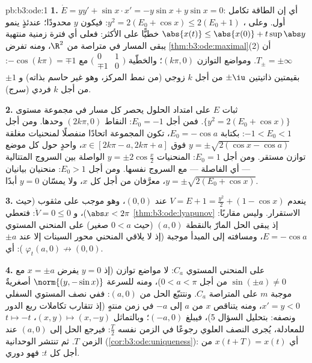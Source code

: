 \begin{solution}{pb:b3:ode:1}
\textbf{1.} $\dot E = yy' + \sin x\cdot x' = -y\sin x +
y\sin x = 0$: أي إن الطاقة تكامل أول. وعلى ،
$y^2 = 2(E_0 + \cos x) \leq 2(E_0 + 1)$: فيكون $y$ محدودًا؛ عندئذٍ ينمو $\abs{x(t)} \leq \abs{x(0)} +
t\sup\abs y$ خطيًّا على
الأكثر: فعلى أي فترة زمنية منتهية يبقى المسار في متراصة من
$\R^2$، ومنه تفرض \cref{thm:b3:ode:maximal}(2) أن $T_\pm = \pm\infty$. ومواضع التوازن
$(k\pi, 0)$؛ والخطّية $\bigl(\begin{smallmatrix}0&1\\
\mp1&0\end{smallmatrix}\bigr)$ مع $-\cos(k\pi) = \mp1$: بقيمتين ذاتيتين
$\pm\iu$ من أجل $k$ زوجي (من نمط المركز، وهو غير حاسم بذاته)
و $\pm1$ من أجل $k$ فردي (سرج).

\textbf{2.} ثبات $E$ على امتداد الحلول يحصر كل مسار في مجموعة
مستوى $\{y^2 = 2(E_0 + \cos x)\}$. فمن أجل $E_0 = -1$: النقاط $(2k\pi, 0)$ وحدها.
ومن أجل $-1 < E_0 <
1$: بكتابة $E_0 = -\cos a$، تكون المجموعة اتحادًا
منفصلًا لمنحنيات مغلقة $y = \pm\sqrt{2(\cos x - \cos a)}$ فوق $x \in
[2k\pi - a, 2k\pi + a]$، واحدٍ حول كل موضع
توازن مستقر. ومن أجل $E_0 = 1$: المنحنيات $y = \pm2\cos\frac x2$ الواصلة بين
السروج المتتالية --- أي الفاصلة --- مع السروج نفسها. ومن أجل
$E_0 > 1$: منحنيان بيانيان $y =
\pm\sqrt{2(E_0 + \cos x)}$، معرَّفان من أجل كل $x$،
ولا يمسّان $y = 0$ أبدًا.

\textbf{3.} ينعدم $V = E + 1 = \frac{y^2}2 + (1 - \cos x)$ عند $(0,0)$، وهو موجب على  مثقوب
(حيث $\abs x < 2\pi$)، و $\dot V = 0 \leq 0$: فتعطي \cref{thm:b3:ode:lyapunov} الاستقرار.
وليس مقاربًا: إذ يبقى الحل المارّ بالنقطة $(a, 0)$ (حيث
$0 < a$ صغير) على المنحني المستوي $E = -\cos a$، ومسافته إلى
المبدأ موجبة (إذ لا يلاقي المنحني محور السينات إلا عند
$\pm a$): أي $\varphi_t(a, 0) \not\to (0,0)$.

\textbf{4.} على المنحني المستوي $C_a$: لا مواضع توازن (إذ
$y = 0$ يفرض $x = \pm a$ مع $\sin(\pm a) \neq 0$ من أجل $0 < a <
\pi$)، ومنه
للسرعة $\norm{(y, -\sin x)}$ أصغريةٌ موجبة $m$ على المتراصة $C_a$. ونتتبّع
الحل من $(a, 0)$: ففي نصف المستوي السفلي $x' = y < 0$، ومنه
يتناقص $x$ من $a$ إلى $-a$ في زمن منتهٍ (إذ تتقارب تكاملات ربع
الدور ونصفه: بتحليل السؤال 5)، فيبلغ $(-a, 0)$؛ وبالتماثل
$(x, y) \mapsto (x, -y)$، $t
\mapsto -t$ للمعادلة، يُجرى النصف العلوي رجوعًا في الزمن
نفسه $\frac T2$: فيرجع الحل إلى $(a, 0)$ عند الزمن $T$. ثم
تنتشر الوحدانية (\cref{cor:b3:ode:uniqueness}): أي $x(t + T) =
x(t)$ من أجل كل $t$: فهو
دوري.


\end{solution}
